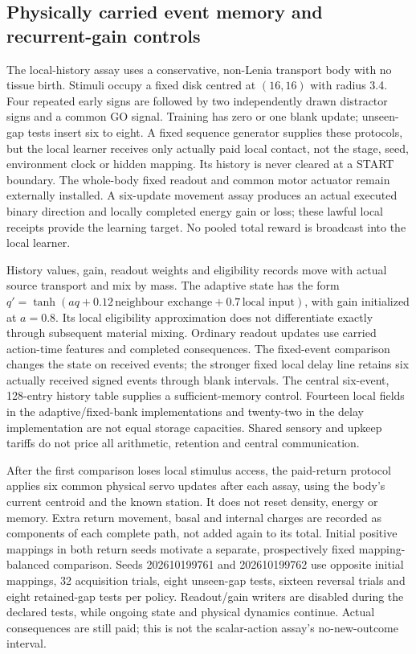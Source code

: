 \subsection*{Physically carried event memory and recurrent-gain controls}

The local-history assay uses a conservative, non-Lenia transport body with no tissue birth. Stimuli occupy a fixed disk centred at $(16,16)$ with radius 3.4. Four repeated early signs are followed by two independently drawn distractor signs and a common GO signal. Training has zero or one blank update; unseen-gap tests insert six to eight. A fixed sequence generator supplies these protocols, but the local learner receives only actually paid local contact, not the stage, seed, environment clock or hidden mapping. Its history is never cleared at a START boundary. The whole-body fixed readout and common motor actuator remain externally installed. A six-update movement assay produces an actual executed binary direction and locally completed energy gain or loss; these lawful local receipts provide the learning target. No pooled total reward is broadcast into the local learner.

History values, gain, readout weights and eligibility records move with actual source transport and mix by mass. The adaptive state has the form $q'=\tanh(aq+0.12\,\text{neighbour exchange}+0.7\,\text{local input})$, with gain initialized at $a=0.8$. Its local eligibility approximation does not differentiate exactly through subsequent material mixing. Ordinary readout updates use carried action-time features and completed consequences. The fixed-event comparison changes the state on received events; the stronger fixed local delay line retains six actually received signed events through blank intervals. The central six-event, 128-entry history table supplies a sufficient-memory control. Fourteen local fields in the adaptive/fixed-bank implementations and twenty-two in the delay implementation are not equal storage capacities. Shared sensory and upkeep tariffs do not price all arithmetic, retention and central communication.

After the first comparison loses local stimulus access, the paid-return protocol applies six common physical servo updates after each assay, using the body's current centroid and the known station. It does not reset density, energy or memory. Extra return movement, basal and internal charges are recorded as components of each complete path, not added again to its total. Initial positive mappings in both return seeds motivate a separate, prospectively fixed mapping-balanced comparison. Seeds 202610199761 and 202610199762 use opposite initial mappings, 32 acquisition trials, eight unseen-gap tests, sixteen reversal trials and eight retained-gap tests per policy. Readout/gain writers are disabled during the declared tests, while ongoing state and physical dynamics continue. Actual consequences are still paid; this is not the scalar-action assay's no-new-outcome interval.

